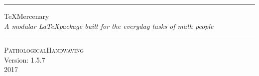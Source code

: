 

\pagestyle{empty}

\begin{center}
\vspace{25px}
\hrule
\vspace{10px}
{\Huge TeXMercenary} \\
{\large \itshape A modular \LaTeX package built for the everyday tasks of math people} \\
\vspace{10px}
\hrule
\vspace{100px}
{\large \scshape PathologicalHandwaving} \\
{\large Version: 1.5.7} \\
{\large 2017} \\


\end{center}

\pagebreak